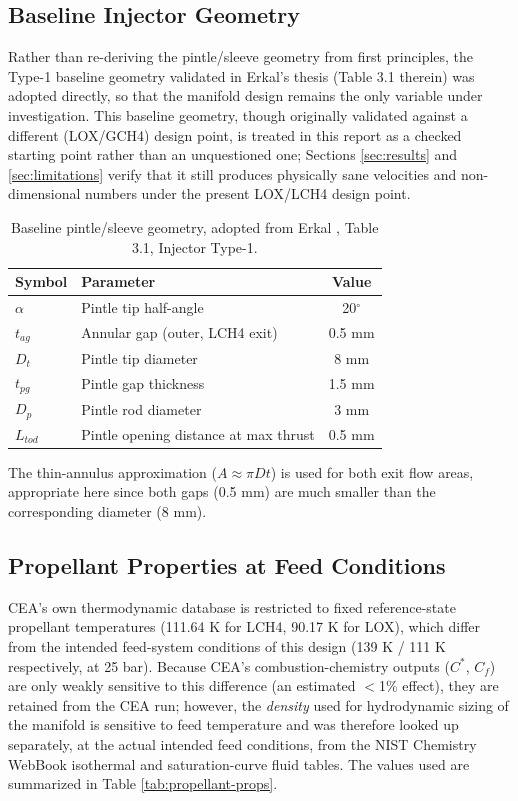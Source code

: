 \documentclass[11pt,a4paper]{article}
\begin{document}
\subsection{Baseline Injector Geometry}
\label{sec:baseline-geom}

Rather than re-deriving the pintle/sleeve geometry from first principles, the Type-1 baseline geometry validated in Erkal's thesis \cite{erkal2019} (Table 3.1 therein) was adopted directly, so that the manifold design remains the only variable under investigation. This baseline geometry, though originally validated against a different (LOX/GCH4) design point, is treated in this report as a checked starting point rather than an unquestioned one; Sections \ref{sec:results} and \ref{sec:limitations} verify that it still produces physically sane velocities and non-dimensional numbers under the present LOX/LCH4 design point.

\begin{table}[h]
\centering
\caption{Baseline pintle/sleeve geometry, adopted from Erkal \cite{erkal2019}, Table 3.1, Injector Type-1.}
\label{tab:baseline-geom}
\begin{tabular}{@{}llc@{}}
\toprule
Symbol & Parameter & Value \\
\midrule
$\alpha$ & Pintle tip half-angle & 20$^\circ$ \\
$t_{ag}$ & Annular gap (outer, LCH4 exit) & 0.5 mm \\
$D_t$ & Pintle tip diameter & 8 mm \\
$t_{pg}$ & Pintle gap thickness & 1.5 mm \\
$D_p$ & Pintle rod diameter & 3 mm \\
$L_{tod}$ & Pintle opening distance at max thrust & 0.5 mm \\
\bottomrule
\end{tabular}
\end{table}

The thin-annulus approximation ($A \approx \pi D t$) is used for both exit flow areas, appropriate here since both gaps (0.5 mm) are much smaller than the corresponding diameter (8 mm).

\subsection{Propellant Properties at Feed Conditions}

CEA's own thermodynamic database is restricted to fixed reference-state propellant temperatures (111.64 K for LCH4, 90.17 K for LOX), which differ from the intended feed-system conditions of this design (139 K / 111 K respectively, at 25 bar). Because CEA's combustion-chemistry outputs ($C^*$, $C_f$) are only weakly sensitive to this difference (an estimated $<$1\% effect), they are retained from the CEA run; however, the \emph{density} used for hydrodynamic sizing of the manifold is sensitive to feed temperature and was therefore looked up separately, at the actual intended feed conditions, from the NIST Chemistry WebBook isothermal and saturation-curve fluid tables. The values used are summarized in Table \ref{tab:propellant-props}.
\end{document}
